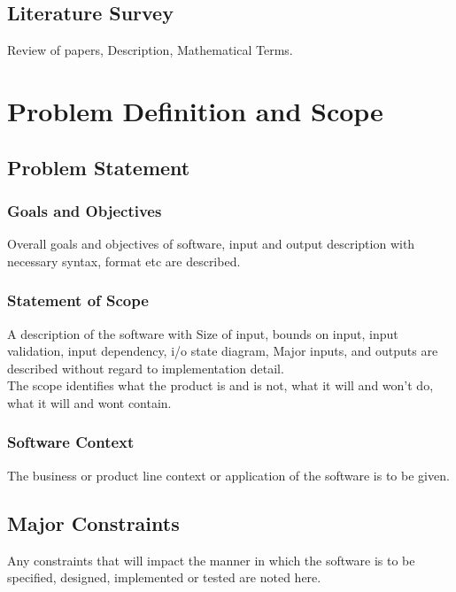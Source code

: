 \documentclass{report} %
\begin{document}
		\section{Literature Survey}
		Review of papers, Description, Mathematical Terms.

		
	\chapter{Problem Definition and Scope}
	\pagebreak
		\section{Problem Statement}
		\lipsum[4]
		
		\subsection{Goals and Objectives}
		Overall goals and objectives of software, input and output description with
		necessary syntax, format etc are described.
	
		\subsection{Statement of Scope}
		A description of the software with Size of input, bounds on input, input validation, input dependency, i/o state diagram, Major inputs, and outputs are
		described without regard to implementation detail. 
		\\
		The scope identifies what the product is and is not, what it will and won’t do,
		what it will and wont contain. \\
		
		\subsection{Software Context}
		The business or product line context or application of the software is to be given.
		
		\section{Major Constraints}
		Any constraints that will impact the manner in which the software is to be specified, designed, implemented or tested are noted here.
		
\end{document}
